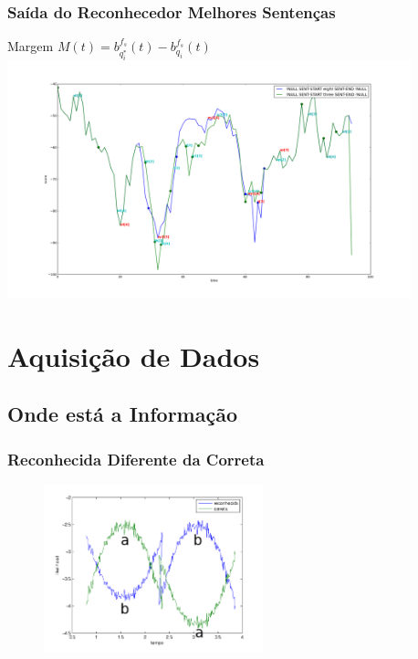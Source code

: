 \documentclass{beamer}
\begin{document}
  \begin{frame}
    \frametitle{Saída do Reconhecedor Melhores Sentenças}
    \begin{center}
      \vspace{0.1in}
      Margem
      $M(t) = b_{q^{*}_{i}}^{f_{s}}(t) - b_{q_{i}}^{f_{s}}(t)$
      \includegraphics[width=4.6in]{9}
    \end{center}
  \end{frame}

  \section{Aquisição de Dados}
  \subsection{Onde está a Informação}
  \begin{frame}
    \frametitle{Reconhecida Diferente da Correta}
    \begin{figure}[ht]
      \begin{center}
	\includegraphics[width=2.5in]{corr_neq_rec}
      \end{center}
    \end{figure}
  \end{frame}
\end{document}
